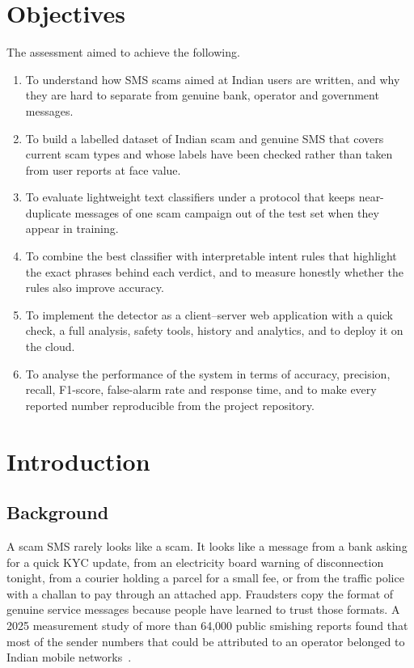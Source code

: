 \documentclass[12pt,a4paper]{report}
\begin{document}
\chapter{Objectives}
The assessment aimed to achieve the following.
\begin{enumerate}
\item To understand how SMS scams aimed at Indian users are written, and why they are hard to separate from genuine bank, operator and government messages.
\item To build a labelled dataset of Indian scam and genuine SMS that covers current scam types and whose labels have been checked rather than taken from user reports at face value.
\item To evaluate lightweight text classifiers under a protocol that keeps near-duplicate messages of one scam campaign out of the test set when they appear in training.
\item To combine the best classifier with interpretable intent rules that highlight the exact phrases behind each verdict, and to measure honestly whether the rules also improve accuracy.
\item To implement the detector as a client--server web application with a quick check, a full analysis, safety tools, history and analytics, and to deploy it on the cloud.
\item To analyse the performance of the system in terms of accuracy, precision, recall, F1-score, false-alarm rate and response time, and to make every reported number reproducible from the project repository.
\end{enumerate}

\chapter{Introduction}

\section{Background}
A scam SMS rarely looks like a scam. It looks like a message from a bank asking for a quick KYC update, from an electricity board warning of disconnection tonight, from a courier holding a parcel for a small fee, or from the traffic police with a challan to pay through an attached app. Fraudsters copy the format of genuine service messages because people have learned to trust those formats. A 2025 measurement study of more than 64,000 public smishing reports found that most of the sender numbers that could be attributed to an operator belonged to Indian mobile networks~\cite{agarwal2025fishing}.
\end{document}
